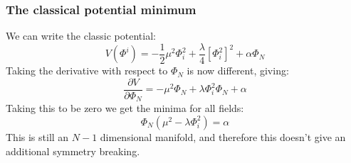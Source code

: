 \documentclass{article}
\begin{document}
\subsubsection{The classical potential minimum}
We can write the classic potential:
\begin{equation}
    V(\Phi^i) = -\frac{1}{2}\mu^2\Phi_i^2 + \frac{\lambda}{4}\left[\Phi_i^2\right]^2 + \alpha \Phi_N
\end{equation}
Taking the derivative with respect to $\Phi_N$ is now different, giving:
\begin{equation}
        \frac{\partial V}{\partial\Phi_N} = -\mu^2\Phi_N + \lambda\Phi_i^2\Phi_N + \alpha
\end{equation}
Taking this to be zero we get the minima for all fields:
\begin{equation}
    \Phi_N\left(\mu^2 - \lambda\Phi_i^2\right) = \alpha
\end{equation}
This is still an $N-1$ dimensional manifold, and therefore this doesn't give an additional symmetry breaking.
\end{document}
